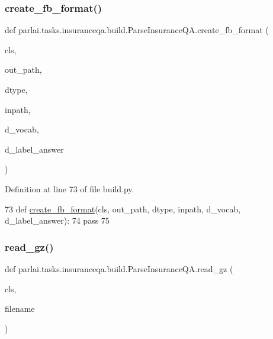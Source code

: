 \subsubsection{\texorpdfstring{create\+\_\+fb\+\_\+format()}{create\_fb\_format()}}
{\footnotesize\ttfamily def parlai.\+tasks.\+insuranceqa.\+build.\+Parse\+Insurance\+Q\+A.\+create\+\_\+fb\+\_\+format (\begin{DoxyParamCaption}\item[{}]{cls,  }\item[{}]{out\+\_\+path,  }\item[{}]{dtype,  }\item[{}]{inpath,  }\item[{}]{d\+\_\+vocab,  }\item[{}]{d\+\_\+label\+\_\+answer }\end{DoxyParamCaption})}



Definition at line 73 of file build.\+py.


\begin{DoxyCode}
73     \textcolor{keyword}{def }\hyperlink{namespaceparlai_1_1tasks_1_1wikiqa_1_1build_a554828702769592403db58c955d1dfe3}{create\_fb\_format}(cls, out\_path, dtype, inpath, d\_vocab, d\_label\_answer):
74         \textcolor{keywordflow}{pass}
75 
\end{DoxyCode}
\mbox{\label{classparlai_1_1tasks_1_1insuranceqa_1_1build_1_1ParseInsuranceQA_a3f2322d59e42f329387912bd3d03c888}} 
\subsubsection{\texorpdfstring{read\+\_\+gz()}{read\_gz()}}
{\footnotesize\ttfamily def parlai.\+tasks.\+insuranceqa.\+build.\+Parse\+Insurance\+Q\+A.\+read\+\_\+gz (\begin{DoxyParamCaption}\item[{}]{cls,  }\item[{}]{filename }\end{DoxyParamCaption})}



